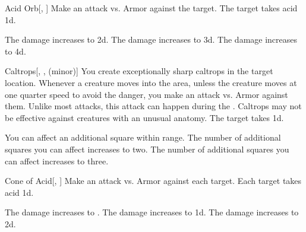 \lowercase{\hypertarget{spell:Acid Orb}{}}\label{spell:Acid Orb}
\begin{freeability}[Rank 1]{\hypertarget{spell:Acid Orb}{Acid Orb}}[, ]
Make an attack vs. Armor against the target.
\hit The target takes acid  \plus1d.

\rankline
{} The damage increases to  \plus2d.
 The damage increases to  \plus3d.
 The damage increases to  \plus4d.
\end{freeability}
\vspace{0.25em}



\lowercase{\hypertarget{spell:Caltrops}{}}\label{spell:Caltrops}
\begin{freeability}[Rank 1]{\hypertarget{spell:Caltrops}{Caltrops}}[, ,  (minor)]
You create exceptionally sharp caltrops in the target location.
Whenever a creature moves into the area, unless the creature moves at one quarter speed to avoid the danger, you make an attack vs. Armor against them.
Unlike most attacks, this attack can happen during the .
Caltrops may not be effective against creatures with an unusual anatomy.
\hit The target takes  \minus1d.

\rankline
{} You can affect an additional square within range.
 The number of additional squares you can affect increases to two.
 The number of additional squares you can affect increases to three.
\end{freeability}
\vspace{0.25em}



\lowercase{\hypertarget{spell:Cone of Acid}{}}\label{spell:Cone of Acid}
\begin{freeability}[Rank 1]{\hypertarget{spell:Cone of Acid}{Cone of Acid}}[, ]
Make an attack vs. Armor against each target.
\hit Each target takes acid  \minus1d.

\rankline
{} The damage increases to .
 The damage increases to  \plus1d.
 The damage increases to  \plus2d.
\end{freeability}
\vspace{0.25em}



